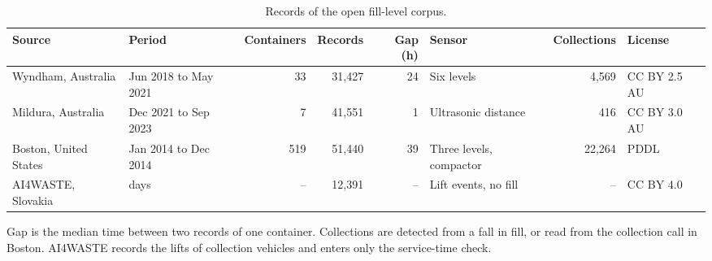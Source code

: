 \begin{table}[!htbp]
\caption{Records of the open fill-level corpus.}
\label{tab:corpus}
\centering
\footnotesize
\setlength{\tabcolsep}{3pt}
\begin{tabular}{>{\raggedright\arraybackslash}p{}>{\raggedright\arraybackslash}p{}rrr>{\raggedright\arraybackslash}p{}rl}
\toprule
Source & Period & Containers & Records & Gap (h) & Sensor & Collections & License \\
\midrule
Wyndham, Australia & Jun 2018 to May 2021 & 33 & 31{,}427 & 24 & Six levels & 4{,}569 & CC BY 2.5 AU \\
Mildura, Australia & Dec 2021 to Sep 2023 & 7 & 41{,}551 & 1 & Ultrasonic distance & 416 & CC BY 3.0 AU \\
Boston, United States & Jan 2014 to Dec 2014 & 519 & 51{,}440 & 39 & Three levels, compactor & 22{,}264 & PDDL \\
AI4WASTE, Slovakia & 17 days & -- & 12{,}391 & -- & Lift events, no fill & -- & CC BY 4.0 \\
\bottomrule
\end{tabular}
\par\smallskip\footnotesize Gap is the median time between two records of one container. Collections are detected from a fall in fill, or read from the collection call in Boston. AI4WASTE records the lifts of collection vehicles and enters only the service-time check.
\end{table}
